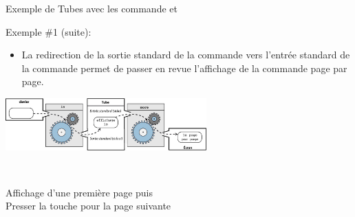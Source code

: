 \begin{frame}{Exemple de Tubes avec les commande  et }
  \begin{alertblock}{Exemple \#1 (suite):}
    \begin{itemize}
    \item La redirection de la sortie standard de la commande 
      vers l'entrée standard de la commande  permet de passer
      en revue l'affichage de la commande  page par page.
    \end{itemize}
    \begin{center}
      \includegraphics[height=2cm]{img/s05/stdin_stdout_tube_ls_more.jpg}
    \end{center}
    \begin{columns}
      \begin{column}{6cm}
        \small{ \\
          Affichage d'une première page puis \\
          Presser la touche \Enter pour la page suivante\\
           }
      \end{column}
      \begin{column}{6cm}
      \end{column}
    \end{columns}
  \end{alertblock}
\end{frame}


